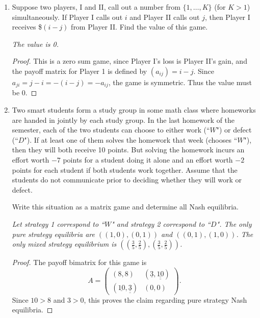 \documentclass[10pt]{article}
\begin{document}
\begin{enumerate}
\begin{proof}
Let $x \in N$.  Then $g(x) = 0$, so no follower $y$ of $x$ satisfies $g(y) = 0$, otherwise $0$ could not be the least number in $g \circ f(x)$.  Thus no follower of $x$ is in $N$.
\end{proof}

\item Suppose two players, I and II, call out a number from $\{1, \dots , K \}$ (for $K > 1$) simultaneously.  If Player I calls out $i$ and Player II calls out $j$, then Player I receives \$$(i-j)$ from Player II.  Find the value of this game.

\noindent \emph{The value is 0.}

\begin{proof}
This is a zero sum game, since Player I's loss is Player II's gain, and the payoff matrix for Player 1 is defined by $(a_{ij}) = i-j$.  Since $a_{ji} = j - i = -(i-j) = - a_{ij}$, the game is symmetric.  Thus the value must be 0.
\end{proof}

\item Two smart students form a study group in some math class where homeworks are handed in jointly by each study group. In the last homework of the semester, each of the two students can choose to either work (``$W$") or defect (``$D$"). If at least one of them solves the homework that week (chooses ``$W$"), then they will both receive 10 points. But solving the homework incurs an effort worth $-7$ points for a student doing it alone and an effort worth $-2$ points for each student if both students work together. Assume that the students do not communicate prior to deciding whether they will work or defect.

\noindent Write this situation as a matrix game and determine all Nash equilibria.

\noindent \emph{Let strategy 1 correspond to ``$W$" and strategy 2 correspond to ``$D$".  The only pure strategy equilibria are $((1,0),(0,1))$ and $((0,1),(1,0))$.  The only mixed strategy equilibrium is $((\frac35, \frac25), (\frac35, \frac25))$.}

\begin{proof}
The payoff bimatrix for this game is
$$
A =
\begin{pmatrix}
(8,8) & (\underline{3},\underline{\underline{10}}) \\
(\underline{10},\underline{\underline{3}}) & (0,0)
\end{pmatrix}.
$$
Since $10 > 8$ and $3 > 0$, this proves the claim regarding pure strategy Nash equilibria.


\end{proof}
\end{enumerate}
\end{document}
